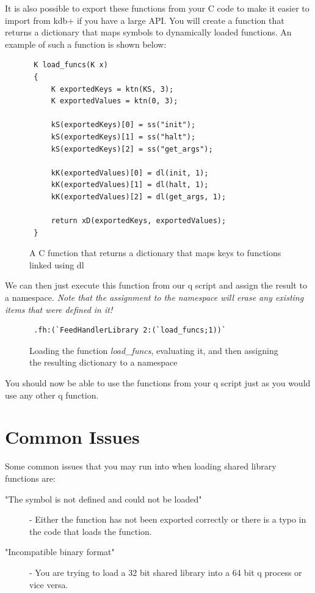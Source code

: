  It is also possible to export these functions from your C code to make it easier to import from kdb+ if you have a large API. You will create a function that returns a dictionary that maps symbols to dynamically loaded functions. An example of such a function is shown below:
 
 \begin{figure}[H]
 \begin{lstlisting}
 K load_funcs(K x)
 {
	 K exportedKeys = ktn(KS, 3);
	 K exportedValues = ktn(0, 3);
 
	 kS(exportedKeys)[0] = ss("init");
	 kS(exportedKeys)[1] = ss("halt");
	 kS(exportedKeys)[2] = ss("get_args");
 
	 kK(exportedValues)[0] = dl(init, 1);
	 kK(exportedValues)[1] = dl(halt, 1);
	 kK(exportedValues)[2] = dl(get_args, 1);
 
	 return xD(exportedKeys, exportedValues);
 }
 \end{lstlisting}
 \caption{A C function that returns a dictionary that maps keys to functions linked using dl}
 \end{figure}
 
 We can then just execute this function from our q script and assign the result to a namespace. \textit{Note that the assignment to the namespace will erase any existing items that were defined in it!}
 
 \begin{figure}[H]
 \begin{lstlisting}
 .fh:(`FeedHandlerLibrary 2:(`load_funcs;1))`
 \end{lstlisting}
 \caption{Loading the function \textit{load\_funcs}, evaluating it, and then assigning the resulting dictionary to a namespace}
 \end{figure}
 
 You should now be able to use the functions from your q script just as you would use any other q function. 
 
 \section{Common Issues}
 
 Some common issues that you may run into when loading shared library functions are:
 
 \begin{description}
 	\item["The symbol is not defined and could not be loaded"] - Either the function has not been exported correctly or there is a typo in the code that loads the function.
 	
 	\item["Incompatible binary format"] - You are trying to load a 32 bit shared library into a 64 bit q process or vice versa.
 \end{description}